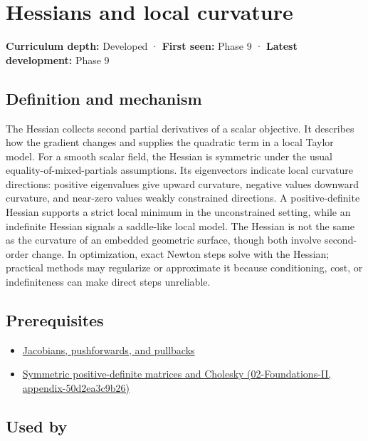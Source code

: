 \hypertarget{appendix-6ac071f8b50c}{}
\section{Hessians and local curvature}\label{appendix-6ac071f8b50c-hessians-and-local-curvature}

\textbf{Curriculum depth:} Developed · \textbf{First seen:} Phase 9 · \textbf{Latest development:} Phase 9

\subsection{Definition and mechanism}\label{appendix-6ac071f8b50c-definition-and-mechanism}

The Hessian collects second partial derivatives of a scalar objective. It describes how the gradient changes and supplies the quadratic term in a local Taylor model. For a smooth scalar field, the Hessian is symmetric under the usual equality-of-mixed-partials assumptions. Its eigenvectors indicate local curvature directions: positive eigenvalues give upward curvature, negative values downward curvature, and near-zero values weakly constrained directions. A positive-definite Hessian supports a strict local minimum in the unconstrained setting, while an indefinite Hessian signals a saddle-like local model. The Hessian is not the same as the curvature of an embedded geometric surface, though both involve second-order change. In optimization, exact Newton steps solve with the Hessian; practical methods may regularize or approximate it because conditioning, cost, or indefiniteness can make direct steps unreliable.

\subsection{Prerequisites}\label{appendix-6ac071f8b50c-prerequisites}

\begin{itemize}
\tightlist
\item
  \hyperref[appendix-d8a7ddb675eb]{Jacobians, pushforwards, and pullbacks}
\item
  \href{../02-Foundations-II/main.pdf\#nameddest=appendix-50d2ea3c9b26}{Symmetric positive-definite matrices and Cholesky (02-Foundations-II, appendix-50d2ea3c9b26)}
\end{itemize}

\subsection{Used by}\label{appendix-6ac071f8b50c-used-by}

